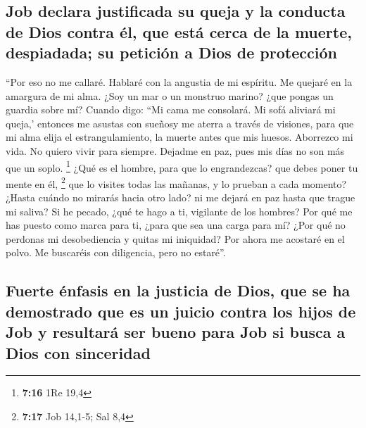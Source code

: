 \hypertarget{job-declara-justificada-su-queja-y-la-conducta-de-dios-contra-uxe9l-que-estuxe1-cerca-de-la-muerte-despiadada-su-peticiuxf3n-a-dios-de-protecciuxf3n}{%
\subsection{Job declara justificada su queja y la conducta de Dios
contra él, que está cerca de la muerte, despiadada; su petición a Dios
de
protección}\label{job-declara-justificada-su-queja-y-la-conducta-de-dios-contra-uxe9l-que-estuxe1-cerca-de-la-muerte-despiadada-su-peticiuxf3n-a-dios-de-protecciuxf3n}}

 ``Por eso no me callaré. Hablaré con la angustia de mi
espíritu. Me quejaré en la amargura de mi alma.  ¿Soy un
mar o un monstruo marino? ¿que pongas un guardia sobre mí?
 Cuando digo: ``Mi cama me consolará. Mi sofá aliviará mi
queja,'  entonces me asustas con sueñosy me aterra a
través de visiones,  para que mi alma elija el
estrangulamiento, la muerte antes que mis huesos. 
Aborrezco mi vida. No quiero vivir para siempre. Dejadme en paz, pues
mis días no son más que un soplo. \footnote{\textbf{7:16} 1Re 19,4}
 ¿Qué es el hombre, para que lo engrandezcas? que debes
poner tu mente en él, \footnote{\textbf{7:17} Job 14,1-5; Sal 8,4}
 que lo visites todas las mañanas, y lo prueban a cada
momento?  ¿Hasta cuándo no mirarás hacia otro lado? ni me
dejará en paz hasta que trague mi saliva?  Si he pecado,
¿qué te hago a ti, vigilante de los hombres? Por qué me has puesto como
marca para ti, ¿para que sea una carga para mí?  ¿Por qué
no perdonas mi desobediencia y quitas mi iniquidad? Por ahora me
acostaré en el polvo. Me buscaréis con diligencia, pero no estaré''.

\hypertarget{fuerte-uxe9nfasis-en-la-justicia-de-dios-que-se-ha-demostrado-que-es-un-juicio-contra-los-hijos-de-job-y-resultaruxe1-ser-bueno-para-job-si-busca-a-dios-con-sinceridad}{%
\subsection{Fuerte énfasis en la justicia de Dios, que se ha demostrado
que es un juicio contra los hijos de Job y resultará ser bueno para Job
si busca a Dios con
sinceridad}\label{fuerte-uxe9nfasis-en-la-justicia-de-dios-que-se-ha-demostrado-que-es-un-juicio-contra-los-hijos-de-job-y-resultaruxe1-ser-bueno-para-job-si-busca-a-dios-con-sinceridad}}

